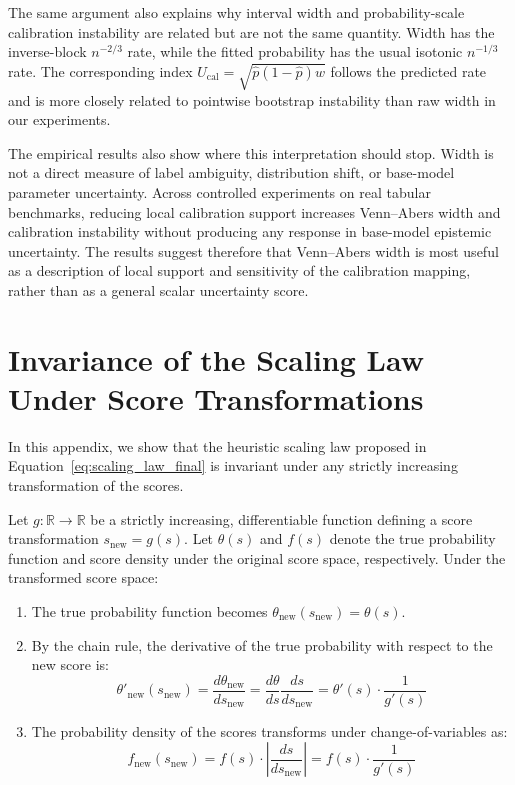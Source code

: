 \documentclass[11pt]{article}
\begin{document}
	The same argument also explains why interval width and probability-scale calibration instability are related but are not the same quantity. Width has the inverse-block $n^{-2/3}$ rate, while the fitted probability has the usual isotonic $n^{-1/3}$ rate. The corresponding index $U_{\mathrm{cal}}=\sqrt{\hat p(1-\hat p)w}$ follows the predicted rate and is more closely related to pointwise bootstrap instability than raw width in our experiments.

	The empirical results also show where this interpretation should stop. Width is not a direct measure of label ambiguity, distribution shift, or base-model parameter uncertainty. Across controlled experiments on real tabular benchmarks, reducing local calibration support increases Venn--Abers width and calibration instability without producing any response in base-model epistemic uncertainty. The results suggest therefore that Venn--Abers width is most useful as a description of local support and sensitivity of the calibration mapping, rather than as a general scalar uncertainty score.

	\appendix
	\section{Invariance of the Scaling Law Under Score Transformations}
	\label{sec:appendix_invariance}
	
	In this appendix, we show that the heuristic scaling law proposed in Equation~\ref{eq:scaling_law_final} is invariant under any strictly increasing transformation of the scores.
	
	Let $g: \mathbb{R} \to \mathbb{R}$ be a strictly increasing, differentiable function defining a score transformation $s_{\text{new}} = g(s)$. Let $\theta(s)$ and $f(s)$ denote the true probability function and score density under the original score space, respectively. Under the transformed score space:
	\begin{enumerate}
		\item The true probability function becomes $\theta_{\text{new}}(s_{\text{new}}) = \theta(s)$.
		\item By the chain rule, the derivative of the true probability with respect to the new score is:
		\begin{equation}
			\theta'_{\text{new}}(s_{\text{new}}) = \frac{d\theta_{\text{new}}}{d s_{\text{new}}} = \frac{d\theta}{ds} \frac{ds}{ds_{\text{new}}} = \theta'(s) \cdot \frac{1}{g'(s)}
		\end{equation}
		\item The probability density of the scores transforms under change-of-variables as:
		\begin{equation}
			f_{\text{new}}(s_{\text{new}}) = f(s) \cdot \left| \frac{ds}{ds_{\text{new}}} \right| = f(s) \cdot \frac{1}{g'(s)}
		\end{equation}
	\end{enumerate}
	
\end{document}
